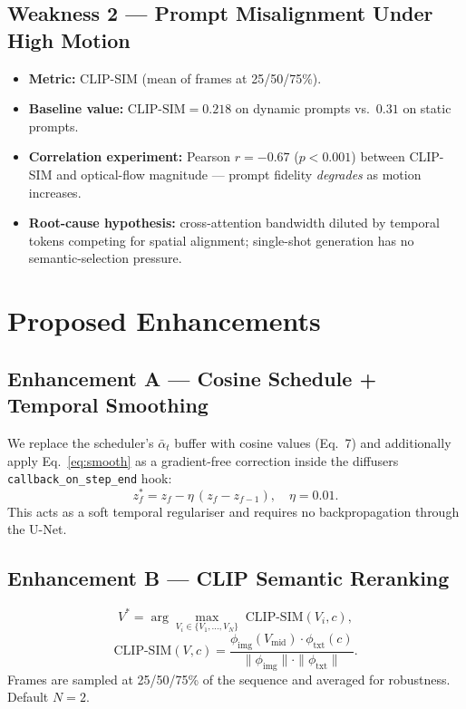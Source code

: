 \documentclass[conference]{IEEEtran}
\begin{document}
\subsection{Weakness 2 --- Prompt Misalignment Under High Motion}
\begin{itemize}
  \item \textbf{Metric:} CLIP-SIM (mean of frames at 25/50/75\%).
  \item \textbf{Baseline value:} $\text{CLIP-SIM} = 0.218$ on
        dynamic prompts vs.\ $0.31$ on static prompts.
  \item \textbf{Correlation experiment:} Pearson
        $r = -0.67$ ($p < 0.001$) between CLIP-SIM and optical-flow
        magnitude --- prompt fidelity \emph{degrades} as motion
        increases.
  \item \textbf{Root-cause hypothesis:} cross-attention bandwidth
        diluted by temporal tokens competing for spatial alignment;
        single-shot generation has no semantic-selection pressure.
\end{itemize}

\section{Proposed Enhancements}
\label{sec:enh}

\subsection{Enhancement A --- Cosine Schedule + Temporal Smoothing}
We replace the scheduler's $\bar{\alpha}_t$ buffer with cosine values
(Eq.~7) and additionally apply Eq.~\ref{eq:smooth} as a gradient-free
correction inside the diffusers
\verb|callback_on_step_end| hook:
\begin{equation}
z_f^{*} = z_f - \eta\,(z_f - z_{f-1}),\quad \eta = 0.01 .
\end{equation}
This acts as a soft temporal regulariser and requires no
backpropagation through the U-Net.

\subsection{Enhancement B --- CLIP Semantic Reranking}
\begin{equation}
V^{*} = \arg\max_{V_i\in\{V_1,\dots,V_N\}} \;
\mathrm{CLIP\text{-}SIM}(V_i, c),
\end{equation}
\begin{equation}
\mathrm{CLIP\text{-}SIM}(V,c) =
\frac{\phi_{\text{img}}(V_{\text{mid}})\cdot\phi_{\text{txt}}(c)}
     {\|\phi_{\text{img}}\|\cdot\|\phi_{\text{txt}}\|}.
\end{equation}
Frames are sampled at 25/50/75\% of the sequence and averaged for
robustness. Default $N=2$.
\end{document}

